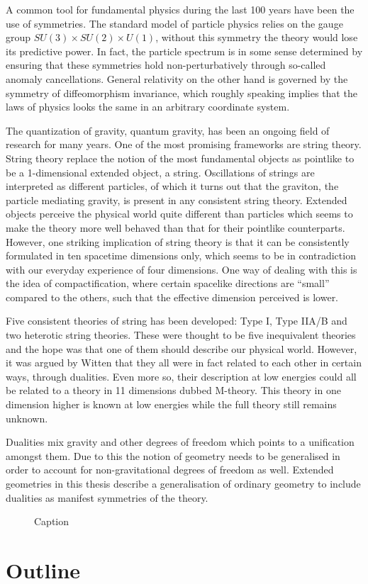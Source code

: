 A common tool for fundamental physics during the last 100 years have been the use of symmetries. The standard model of particle physics relies on the gauge group $SU(3)\times SU(2)\times U(1)$, without this symmetry the theory would lose its predictive power. In fact, the particle spectrum is in some sense determined by ensuring that these symmetries hold non-perturbatively through so-called anomaly cancellations. General relativity on the other hand is governed by the symmetry of diffeomorphism invariance, which roughly speaking implies that the laws of physics looks the same in an arbitrary coordinate system. 

The quantization of gravity, quantum gravity, has been an ongoing field of research for many years. One of the most promising frameworks are string theory. String theory replace the notion of the most fundamental objects as pointlike to be a 1-dimensional extended object, a string. Oscillations of strings are interpreted as different particles, of which it turns out that the graviton, the particle mediating gravity, is present in any consistent string theory. Extended objects perceive the physical world quite different than particles which seems to make the theory more well behaved than that for their pointlike counterparts. However, one striking implication of string theory is that it can be consistently formulated in ten spacetime dimensions only, which seems to be in contradiction with our everyday experience of four dimensions. One way of dealing with this is the idea of compactification, where certain spacelike directions are ``small'' compared to the others, such that the effective dimension perceived is lower. 

Five consistent theories of string has been developed: Type I, Type IIA/B and two heterotic string theories. These were thought to be five inequivalent theories and the hope was that one of them should describe our physical world. However, it was argued by Witten \cite{WittenDualities1995} that they all were in fact related to each other in certain ways, through dualities. Even more so, their description at low energies could all be related to a theory in 11 dimensions dubbed M-theory. This theory in one dimension higher is known at low energies while the full theory still remains unknown.


Dualities mix gravity and other degrees of freedom which points to a unification amongst them. Due to this the notion of geometry needs to be generalised in order to account for non-gravitational degrees of freedom as well. Extended geometries in this thesis describe a generalisation of ordinary geometry to include dualities as manifest symmetries of the theory. 



\begin{figure}
    \caption{Caption}
    \label{fig:my_label}
\end{figure}


\section{Outline}